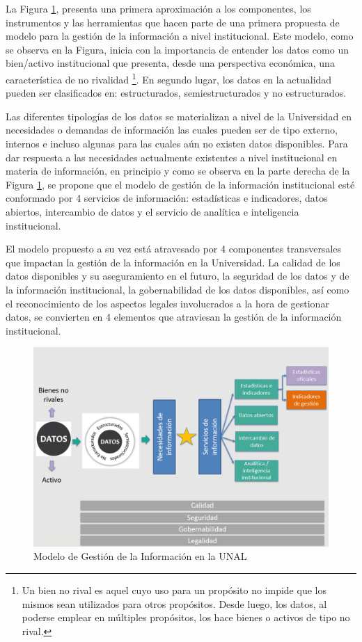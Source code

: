 \documentclass[
]{book}
\begin{document}
La Figura \ref{fig:figura2}, presenta una primera aproximación a los componentes, los instrumentos y las herramientas que hacen parte de una primera propuesta de modelo para la gestión de la información a nivel institucional. Este modelo, como se observa en la Figura, inicia con la importancia de entender los datos como un bien/activo institucional que presenta, desde una perspectiva económica, una característica de no rivalidad \footnote{Un bien no rival es aquel cuyo uso para un propósito no impide que los mismos sean utilizados para otros propósitos. Desde luego, los datos, al poderse emplear en múltiples propósitos, los hace bienes o activos de tipo no rival.}. En segundo lugar, los datos en la actualidad pueden ser clasificados en: estructurados, semiestructurados y no estructurados.

Las diferentes tipologías de los datos se materializan a nivel de la Universidad en necesidades o demandas de información las cuales pueden ser de tipo externo, internos e incluso algunas para las cuales aún no existen datos disponibles. Para dar respuesta a las necesidades actualmente existentes a nivel institucional en materia de información, en principio y como se observa en la parte derecha de la Figura \ref{fig:figura2}, se propone que el modelo de gestión de la información institucional esté conformado por 4 servicios de información: estadísticas e indicadores, datos abiertos, intercambio de datos y el servicio de analítica e inteligencia institucional.

El modelo propuesto a su vez está atravesado por 4 componentes transversales que impactan la gestión de la información en la Universidad. La calidad de los datos disponibles y su aseguramiento en el futuro, la seguridad de los datos y de la información institucional, la gobernabilidad de los datos disponibles, así como el reconocimiento de los aspectos legales involucrados a la hora de gestionar datos, se convierten en 4 elementos que atraviesan la gestión de la información institucional.

\begin{figure}

{\centering \includegraphics[width=1\linewidth]{Imagenes/figura_2} 

}

\caption{Modelo de Gestión de la Información en la UNAL}\label{fig:figura2}
\end{figure}
\end{document}

